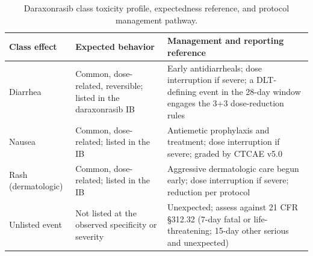 \begin{table}[t]
\caption{Daraxonrasib class toxicity profile, expectedness reference, and protocol management pathway.}
\label{tab:sec04-tox}
\centering
\begin{tabularx}{\textwidth}{L{3.4cm} L{4.0cm} Y}
\toprule
\textbf{Class effect} & \textbf{Expected behavior} & \textbf{Management and reporting reference} \\
\midrule
Diarrhea & Common, dose-related, reversible; listed in the daraxonrasib IB & Early antidiarrheals; dose interruption if severe; a DLT-defining event in the 28-day window engages the 3+3 dose-reduction rules \\
Nausea & Common, dose-related; listed in the IB & Antiemetic prophylaxis and treatment; dose interruption if severe; graded by CTCAE v5.0 \\
Rash (dermatologic) & Common, dose-related; listed in the IB & Aggressive dermatologic care begun early; dose interruption if severe; reduction per protocol \\
Unlisted event & Not listed at the observed specificity or severity & Unexpected; assess against 21 CFR \S 312.32 (7-day fatal or life-threatening; 15-day other serious and unexpected) \\
\bottomrule
\end{tabularx}
\vspace{-0.2cm}
\end{table}

